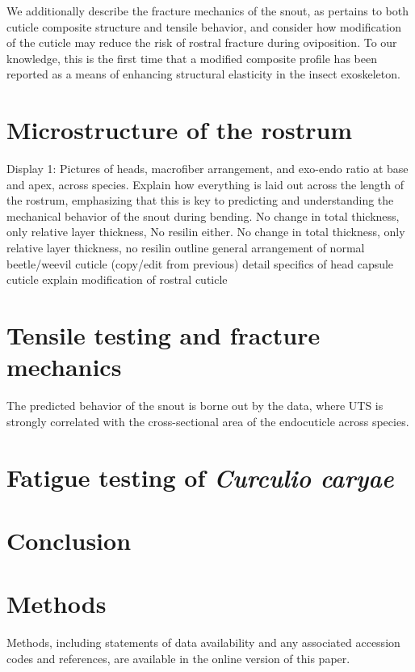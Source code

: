 \documentclass[twocolumn, linenumbers, superscriptaddress]{revtex4-1}
\begin{document}
	We additionally describe the fracture mechanics of the snout, as pertains to both cuticle composite structure and tensile behavior, and consider how modification of the cuticle may reduce the risk of rostral fracture during oviposition.
	To our knowledge, this is the first time that a modified composite profile has been reported as a means of enhancing structural elasticity in the insect exoskeleton.

	\section{Microstructure of the rostrum}\label{sec:microstructure} 
		Display 1: Pictures of heads, macrofiber arrangement, and exo-endo ratio at base and apex, across species.
		Explain how everything is laid out across the length of the rostrum, emphasizing that this is key to predicting and understanding the mechanical behavior of the snout during bending.
		No change in total thickness, only relative layer thickness,
		No resilin either.
		No change in total thickness, only relative layer thickness, no resilin
		outline general arrangement of normal beetle/weevil cuticle (copy/edit from previous)
		detail specifics of head capsule cuticle 
		explain modification of rostral cuticle
	
	\section{Tensile testing and fracture mechanics}
		The predicted behavior of the snout is borne out by the data, where UTS is strongly correlated with the cross-sectional area of the endocuticle across species.
		
	\section{Fatigue testing of \textit{Curculio caryae}}

	\section{Conclusion}

	\section{Methods}
		Methods, including statements of data availability and any associated accession codes and references, are available in the online version of this paper.
	
\end{document}
